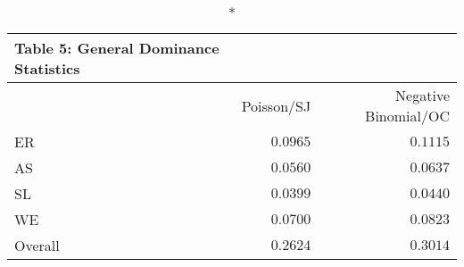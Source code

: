 \begin{longtable}{l|rr}
\caption*{
{\large Table 5: General Dominance Statistics}
} \\ 
\toprule
\multicolumn{1}{l}{} & Poisson/SJ & Negative Binomial/OC \\ 
\midrule
ER & $0.0965$ & $0.1115$ \\ 
AS & $0.0560$ & $0.0637$ \\ 
SL & $0.0399$ & $0.0440$ \\ 
WE & $0.0700$ & $0.0823$ \\ 
Overall & $0.2624$ & $0.3014$ \\ 
\bottomrule
\end{longtable}

